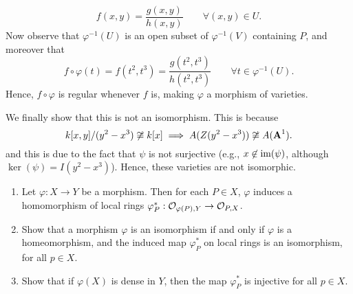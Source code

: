 \documentclass[10pt]{amsart}
\begin{document}
\begin{solution}
\begin{luke}
\begin{enumerate}
\begin{description}[itemsep = 2pt]
                \[
                    f(x, y) = \frac{g(x, y)}{h(x, y)} \qquad \forall (x, y) \in U.  
                \]
                Now observe that $\varphi^{-1}(U)$ is an open subset of $\varphi^{-1}(V)$ containing 
                $P$, and moreover that 
                \[
                    f \circ \varphi(t) = f(t^2, t^3) = \frac{g(t^2, t^3)}{h(t^2, t^3)} \qquad \forall t \in \varphi^{-1}(U).
                \]
                Hence, $f \circ \varphi$ is regular whenever $f$ is, making $\varphi$ a morphism of 
                varieties. 
            \end{description}
            
            We finally show that this is not an isomorphism. This is because 
            \[
                k[x, y]/(y^2 - x^3) \not\cong k[x] \implies A(Z(y^2- x^3)) \not\cong A(\aa^1). 
            \]
            and this is due to the fact that $\psi$ is not surjective (e.g., $x \not\in \im(\psi)$, although $\ker(\psi) = I(y^2 - x^3)$).
            Hence, these varieties are not isomorphic.
           

            

            

            
    
        \end{enumerate}    
    \end{luke}
\end{solution}

\begin{exercise}[3.3]
    \begin{enumerate}[itemsep=1pt]
        \item 
        Let $\varphi:X \to Y$ be a morphism. Then for each $P \in X$, $\varphi$ 
        induces a homomorphism of local rings 
        $\varphi_P^*: \cO_{\varphi(P), Y} \to \cO_{P, X}$.

        \item Show that a morphism $\varphi$ is an isomorphism if and only if $\varphi$ is a 
        homeomorphism, and the induced map $\varphi_P^*$ on local rings 
        is an isomorphism, for all $p \in X$. 

        \item Show that if $\varphi(X)$ is dense in $Y$, 
        then the map $\varphi_P^*$ is injective for all $p \in X$.
    \end{enumerate}
    \end{exercise}
\end{document}
